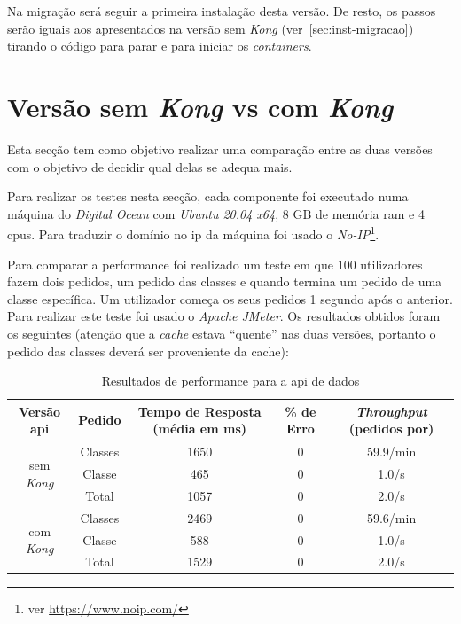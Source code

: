 Na migração será seguir a primeira instalação desta versão. De resto, os passos serão iguais aos apresentados na versão sem \textit{Kong} (ver~\ref{sec:inst-migracao}) tirando o código para parar e para iniciar os \textit{containers}.

\section{Versão sem \textit{Kong} vs com \textit{Kong}}

Esta secção tem como objetivo realizar uma comparação entre as duas versões com o objetivo de decidir qual delas se adequa mais.

Para realizar os testes nesta secção, cada componente foi executado numa máquina do \textit{Digital Ocean} com \textit{Ubuntu 20.04 x64}, 8 GB de memória \acrshort{ram} e 4 \acrshort{cpu}s. Para traduzir o domínio no \acrshort{ip} da máquina foi usado o \textit{No-IP}\footnote{ver \url{https://www.noip.com/}}.

Para comparar a performance foi realizado um teste em que 100 utilizadores fazem dois pedidos, um pedido das classes e quando termina um pedido de uma classe específica. Um utilizador começa os seus pedidos 1 segundo após o anterior. Para realizar este teste foi usado o \textit{Apache JMeter}. Os resultados obtidos foram os seguintes (atenção que a \textit{cache} estava ``quente'' nas duas versões, portanto o pedido das classes deverá ser proveniente da cache):

\begin{table}[H]
    \footnotesize
    \centering
    \begin{tabular}{| c | c | c | c | c | }
        \hline
        Versão \acrshort{api} & Pedido & Tempo de Resposta (média em ms) & \% de Erro & \textit{Throughput} (pedidos por) \\ \hline
        \multirow{3}{*}{sem \textit{Kong}} & Classes & 1650 & 0 & 59.9/min \\ \cline{2-5}
        & Classe & 465 & 0 & 1.0/s \\ \cline{2-5}
        & Total & 1057 & 0 & 2.0/s \\ \hline
        \multirow{3}{*}{com \textit{Kong}} & Classes & 2469 & 0 & 59.6/min \\ \cline{2-5}
        & Classe & 588 & 0 & 1.0/s \\ \cline{2-5}
        & Total & 1529 & 0 & 2.0/s \\ \hline
    \end{tabular}
    \caption{Resultados de performance para a \acrshort{api} de dados}
\end{table}

